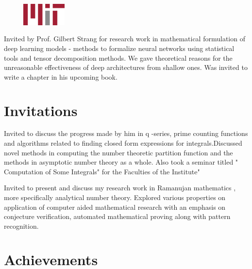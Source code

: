\documentclass[]{deedy-resume-openfont}
\begin{document}
\begin{minipage}[t]{0.66\textwidth}
\begin{figure}
  \begin{center}
    \includegraphics[width=0.20\textwidth]{mitlogo.png}
  \end{center}
\end{figure}
Invited by Prof. Gilbert Strang for research work in mathematical formulation of deep learning models - methods to formalize neural networks using statistical tools and tensor decomposition methods. We gave theoretical reasons for the unreasonable effectiveness of deep architectures from shallow ones. Was invited to write a chapter in his upcoming book.\newline
\sectionsep
\end{minipage} 


\section{Invitations}

Invited to discuss the progress made by him in q -series, prime counting functions and algorithms related to finding closed form expressions for integrals.Discussed novel methods in computing the number theoretic partition function and the methods in asymptotic  number theory as a whole. Also took a seminar titled " Computation of Some Integrals" for the Faculties of the Institute" \newline
\sectionsep


Invited to present and discuss my research work in Ramanujan mathematics , more specifically analytical number theory. Explored various properties on application of computer aided mathematical research with an emphasis on conjecture verification, automated mathematical proving along with pattern recognition.
\sectionsep



\section{Achievements}
\end{document}
